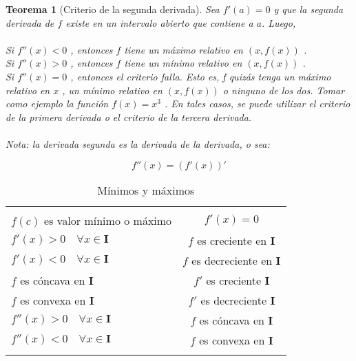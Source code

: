 \documentclass[12pt,a4paper]{extarticle}
\newtheorem{theorem}{Teorema}[section]
\begin{document}
\begin{theorem}[Criterio de la segunda derivada]
Sea \(f'(a)=0\) y que la segunda derivada de \(f\) existe en un
intervalo abierto que contiene a \(a\). Luego, \\
\\
Si \( f ''(x) < 0 \) , entonces \( f \)  tiene un máximo relativo en \( (x, f(x)) \) .\\
Si \( f ''(x) > 0 \) , entonces \( f \)  tiene un mínimo relativo en \( (x, f(x)) \) .\\
Si \( f ''(x) = 0 \) , entonces el criterio falla. Esto es, f quizás
tenga un máximo relativo en \( x \) , un mínimo relativo en \( (x,
f(x)) \)  o ninguno de los dos. Tomar como ejemplo la función \( f(x)
= x^3 \) . En tales casos, se puede utilizar el criterio de la primera
derivada o el criterio de la tercera derivada.\\
\\
Nota: la derivada segunda es la derivada de la derivada, o sea:

\[ f''(x)= (f'(x))' \]

\end{theorem}
\begin{table}[!htbp]
\caption{M\'inimos y m\'aximos}
\begin{center}
\begin{tabular}{ l c}
\hline & \\[0.25em]
\(f(c)\)  es valor m\'inimo o m\'aximo &   \(f'(x) = 0 \) \\[1em]
\( f'(x) > 0 \quad \forall x \in \mathbf{I} \) &  \(f\)  es creciente en \textbf{I}\\[1em]
\( f'(x) < 0 \quad \forall x \in \mathbf{I} \) &  \(f\) es decreciente
en \textbf{I}\\[1em]
\(f\) es c\'oncava en \(\mathbf{I}\) & \(f'\) es creciente
\(\mathbf{I}\)\\[1em]
\(f\) es convexa en \(\mathbf{I}\) & \(f'\) es decreciente
\(\mathbf{I}\)\\[1em]
\(f''(x) > 0  \quad \forall x \in \mathbf{I}\) & \(f\) es c\'oncava en
\textbf{I}\\[1em]
\(f''(x) < 0  \quad \forall x \in \mathbf{I}\) & \(f\) es convexa en
\textbf{I}\\[1em]
\hline\\
\end{tabular}
\end{center}
\label{tab:minmax}
\end{table}
\vspace{0.5em}
\end{document}

